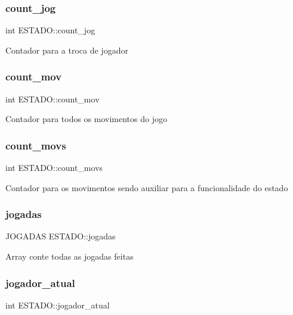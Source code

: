 \subsubsection{\texorpdfstring{count\+\_\+jog}{count\_jog}}
{\footnotesize\ttfamily int E\+S\+T\+A\+D\+O\+::count\+\_\+jog}

Contador para a troca de jogador \mbox{\label{structESTADO_a36e8d21ac156e82ce914ccdafc6796ea}} 
\subsubsection{\texorpdfstring{count\+\_\+mov}{count\_mov}}
{\footnotesize\ttfamily int E\+S\+T\+A\+D\+O\+::count\+\_\+mov}

Contador para todos os movimentos do jogo \mbox{\label{structESTADO_a49b04d6940f820509146c9162ac10542}} 
\subsubsection{\texorpdfstring{count\+\_\+movs}{count\_movs}}
{\footnotesize\ttfamily int E\+S\+T\+A\+D\+O\+::count\+\_\+movs}

Contador para os movimentos sendo auxiliar para a funcionalidade do estado \mbox{\label{structESTADO_afae43b87a488fad0f2b56a18bad31d18}} 
\subsubsection{\texorpdfstring{jogadas}{jogadas}}
{\footnotesize\ttfamily J\+O\+G\+A\+D\+AS E\+S\+T\+A\+D\+O\+::jogadas}

Array conte todas as jogadas feitas \mbox{\label{structESTADO_a5dd28e2e68b7aef2b6b7ea88e02eff58}} 
\subsubsection{\texorpdfstring{jogador\+\_\+atual}{jogador\_atual}}
{\footnotesize\ttfamily int E\+S\+T\+A\+D\+O\+::jogador\+\_\+atual}

